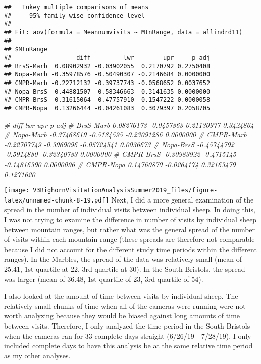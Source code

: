 \documentclass[]{article}
\newenvironment{Shaded}{\begin{snugshade}}{\end{snugshade}}
\newcommand{\CommentTok}[1]{\textcolor[rgb]{0.56,0.35,0.01}{\textit{#1}}}
\begin{document}
\begin{verbatim}
##   Tukey multiple comparisons of means
##     95% family-wise confidence level
## 
## Fit: aov(formula = Meannumvisits ~ MtnRange, data = allindrd11)
## 
## $MtnRange
##                  diff         lwr        upr     p adj
## BrsS-Marb  0.08902932 -0.03902055  0.2170792 0.2750408
## Nopa-Marb -0.35978576 -0.50490307 -0.2146684 0.0000000
## CMPR-Marb -0.22712132 -0.39737743 -0.0568652 0.0037652
## Nopa-BrsS -0.44881507 -0.58346663 -0.3141635 0.0000000
## CMPR-BrsS -0.31615064 -0.47757910 -0.1547222 0.0000058
## CMPR-Nopa  0.13266444 -0.04261083  0.3079397 0.2058705
\end{verbatim}

\begin{Shaded}
\begin{Highlighting}[]
\CommentTok{#                  diff        lwr         upr     p adj}
\CommentTok{# BrsS-Marb  0.08276173 -0.0457863  0.21130977 0.3424864}
\CommentTok{# Nopa-Marb -0.37468619 -0.5184595 -0.23091286 0.0000000}
\CommentTok{# CMPR-Marb -0.22707749 -0.3969096 -0.05724541 0.0036673}
\CommentTok{# Nopa-BrsS -0.45744792 -0.5914880 -0.32340783 0.0000000}
\CommentTok{# CMPR-BrsS -0.30983922 -0.4715145 -0.14816390 0.0000096}
\CommentTok{# CMPR-Nopa  0.14760870 -0.0264174  0.32163479 0.1271620}
\end{Highlighting}
\end{Shaded}

\texttt{[image: V3BighornVisitationAnalysisSummer2019\_files/figure-latex/unnamed-chunk-8-19.pdf]}
Next, I did a more general examination of the spread in the number of
individual visits between individual sheep. In doing this, I was not
trying to examine the difference in number of visits by individual sheep
between mountain ranges, but rather what was the general spread of the
number of visits within each mountain range (these spreads are therefore
not comparable because I did not account for the different study time
periods within the different ranges). In the Marbles, the spread of the
data was relatively small (mean of 25.41, 1st quartile at 22, 3rd
quartile at 30). In the South Bristols, the spread was larger (mean of
36.48, 1st quartile of 23, 3rd quartile of 54).

I also looked at the amount of time between visits by individual sheep.
The relatively small chunks of time when all of the cameras were running
were not worth analyzing because they would be biased against long
amounts of time between visits. Therefore, I only analyzed the time
period in the South Bristols when the cameras ran for 33 complete days
straight (6/26/19 - 7/28/19). I only included complete days to have this
analysis be at the same relative time period as my other analyses.
\end{document}
